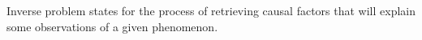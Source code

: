 Inverse problem states for the process of retrieving causal factors that will explain some observations 
of a given phenomenon. 

